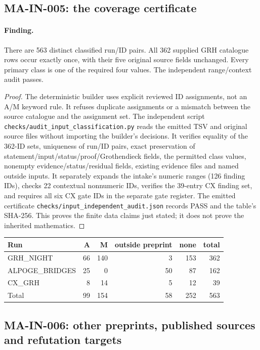 \subsection{MA-IN-005: the coverage certificate}

\paragraph{Finding.}
There are 563 distinct classified run/ID pairs.  All 362 supplied
GRH catalogue rows occur exactly once, with their five original source
fields unchanged.  Every primary class is one of the required four
values.  The independent range/context audit passes.

\begin{proof}
The deterministic builder uses explicit reviewed ID assignments, not
an A/M keyword rule.  It refuses duplicate assignments or a mismatch
between the source catalogue and the assignment set.  The independent
script \texttt{checks/audit\_input\_classification.py} reads the emitted
TSV and original source files without importing the builder's decisions.
It verifies equality of the 362-ID sets, uniqueness of run/ID pairs,
exact preservation of statement/input/status/proof/Grothendieck fields,
the permitted class values, nonempty evidence/status/residual fields,
existing evidence files and named outside inputs.  It separately
expands the intake's numeric ranges (126 finding IDs), checks 22
contextual nonnumeric IDs, verifies the 39-entry CX finding set, and
requires all six CX gate IDs in the separate gate register.
The emitted certificate \texttt{checks/input\_independent\_audit.json}
records PASS and the table's SHA-256.  This proves the finite data
claims just stated; it does not prove the inherited mathematics.
\end{proof}

\begin{center}
\begin{tabular}{lrrrrr}
Run & A & M & outside preprint & none & total\\
\hline
GRH\_NIGHT &66&140&3&153&362\\
ALPOGE\_BRIDGES &25&0&50&87&162\\
CX\_GRH &8&14&5&12&39\\
\hline
Total &99&154&58&252&563
\end{tabular}
\end{center}

\subsection{MA-IN-006: other preprints, published sources and refutation targets}

